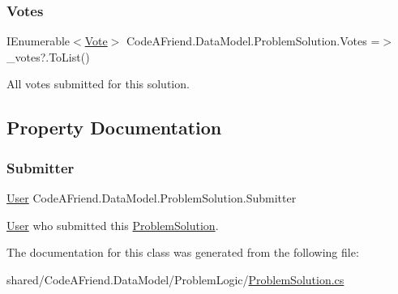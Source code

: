 \subsubsection{\texorpdfstring{Votes}{Votes}}
{\footnotesize\ttfamily I\+Enumerable$<$\mbox{\hyperlink{class_code_a_friend_1_1_data_model_1_1_vote}{Vote}}$>$ Code\+A\+Friend.\+Data\+Model.\+Problem\+Solution.\+Votes =$>$ \+\_\+votes?.To\+List()}



All votes submitted for this solution.



\subsection{Property Documentation}
\mbox{\label{class_code_a_friend_1_1_data_model_1_1_problem_solution_a3ca0acf918b42f59e4c8951b3e8cd68e}} 
\subsubsection{\texorpdfstring{Submitter}{Submitter}}
{\footnotesize\ttfamily \mbox{\hyperlink{class_code_a_friend_1_1_data_model_1_1_user}{User}} Code\+A\+Friend.\+Data\+Model.\+Problem\+Solution.\+Submitter\hspace{0.3cm}{\ttfamily [get]}}



\mbox{\hyperlink{class_code_a_friend_1_1_data_model_1_1_user}{User}} who submitted this \mbox{\hyperlink{class_code_a_friend_1_1_data_model_1_1_problem_solution}{Problem\+Solution}}.



The documentation for this class was generated from the following file\+:\begin{DoxyCompactItemize}
\item 
shared/\+Code\+A\+Friend.\+Data\+Model/\+Problem\+Logic/\mbox{\hyperlink{_problem_solution_8cs}{Problem\+Solution.\+cs}}\end{DoxyCompactItemize}
